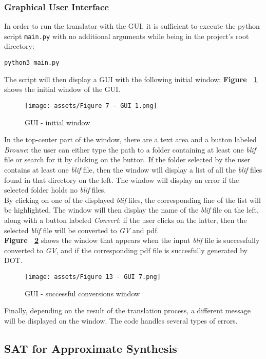 \documentclass[]{usiinfbachelorproject}
\begin{document}
\subsubsection*{Graphical User Interface}
In order to run the translator with the GUI, it is sufficient to execute the python script \texttt{main.py} with no additional arguments while being in the project's root directory:
\begin{center}
    \texttt{python3 main.py}
\end{center}
The script will then display a GUI with the following initial window: \textbf{Figure ~\ref{fig:gui-1}} shows the initial window of the GUI.
\begin{figure}[H]
    \centering
    \texttt{[image: assets/Figure 7 - GUI 1.png]}
    \caption{GUI - initial window}
    \label{fig:gui-1}
\end{figure}
\noindent
In the top-center part of the window, there are a text area and a button labeled \textit{Browse}: the user can either type the path to a folder containing at least one \textit{blif} file or search for it by clicking on the button.
If the folder selected by the user contains at least one \textit{blif} file, then the window will display a list of all the \textit{blif} files found in that directory on the left. The window will display an error if the selected folder holds no \textit{blif} files. \\
By clicking on one of the displayed \textit{blif} files, the corresponding line of the list will be highlighted. The window will then display the name of the \textit{blif} file on the left, along with a button labeled \textit{Convert}: if the user clicks on the latter, then the selected \textit{blif} file will be converted to \textit{GV} and pdf. \\
\textbf{Figure ~\ref{fig:gui-7}} shows the window that appears when the input \textit{blif} file is successfully converted to \textit{GV}, and if the corresponding pdf file is succesfully generated by DOT.
\begin{figure}[H]
    \centering
    \texttt{[image: assets/Figure 13 - GUI 7.png]}
    \caption{GUI - successful conversions window}
    \label{fig:gui-7}
\end{figure}
\noindent
Finally, depending on the result of the translation process, a different message will be displayed on the window. The code handles several types of errors.

\subsection{SAT for Approximate Synthesis}\label{subsec:sat-smt}
\end{document}
